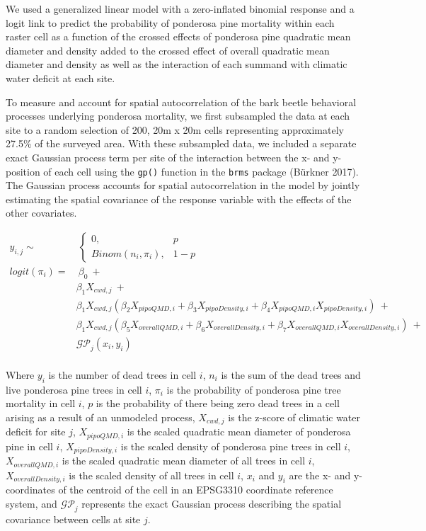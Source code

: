 \documentclass[]{article}
\begin{document}
We used a generalized linear model with a zero-inflated binomial
response and a logit link to predict the probability of ponderosa pine
mortality within each raster cell as a function of the crossed effects
of ponderosa pine quadratic mean diameter and density added to the
crossed effect of overall quadratic mean diameter and density as well as
the interaction of each summand with climatic water deficit at each
site.

To measure and account for spatial autocorrelation of the bark beetle
behavioral processes underlying ponderosa mortality, we first subsampled
the data at each site to a random selection of 200, 20m x 20m cells
representing approximately 27.5\% of the surveyed area. With these
subsampled data, we included a separate exact Gaussian process term per
site of the interaction between the x- and y-position of each cell using
the \texttt{gp()} function in the \texttt{brms} package (Bürkner 2017).
The Gaussian process accounts for spatial autocorrelation in the model
by jointly estimating the spatial covariance of the response variable
with the effects of the other covariates.

\[
\begin{aligned}
y_{i,j} \sim &\ \begin{cases}
0, & p \\
Binom(n_i, \pi_i), & 1-p
\end{cases} \\
logit(\pi_i) = &\ \beta_0\ + \\
& \beta_1X_{cwd, j}\ + \\
& \beta_1X_{cwd, j}(\beta_2X_{pipoQMD, i} + \beta_3X_{pipoDensity, i} + \beta_4X_{pipoQMD, i}X_{pipoDensity, i})\ + \\ 
& \beta_1X_{cwd, j}(\beta_5X_{overallQMD, i} + \beta_6X_{overallDensity, i} + \beta_7X_{overallQMD, i}X_{overallDensity, i})\ + \\
& \mathcal{GP}_j(x_i, y_i) \\
\end{aligned}
\]

Where \(y_i\) is the number of dead trees in cell \(i\), \(n_i\) is the
sum of the dead trees and live ponderosa pine trees in cell \(i\),
\(\pi_i\) is the probability of ponderosa pine tree mortality in cell
\(i\), \(p\) is the probability of there being zero dead trees in a cell
arising as a result of an unmodeled process, \(X_{cwd, j}\) is the
z-score of climatic water deficit for site \(j\), \(X_{pipoQMD, i}\) is
the scaled quadratic mean diameter of ponderosa pine in cell \(i\),
\(X_{pipoDensity, i}\) is the scaled density of ponderosa pine trees in
cell \(i\), \(X_{overallQMD, i}\) is the scaled quadratic mean diameter
of all trees in cell \(i\), \(X_{overallDensity, i}\) is the scaled
density of all trees in cell \(i\), \(x_i\) and \(y_i\) are the x- and
y- coordinates of the centroid of the cell in an EPSG3310 coordinate
reference system, and \(\mathcal{GP}_j\) represents the exact Gaussian
process describing the spatial covariance between cells at site \(j\).
\end{document}
